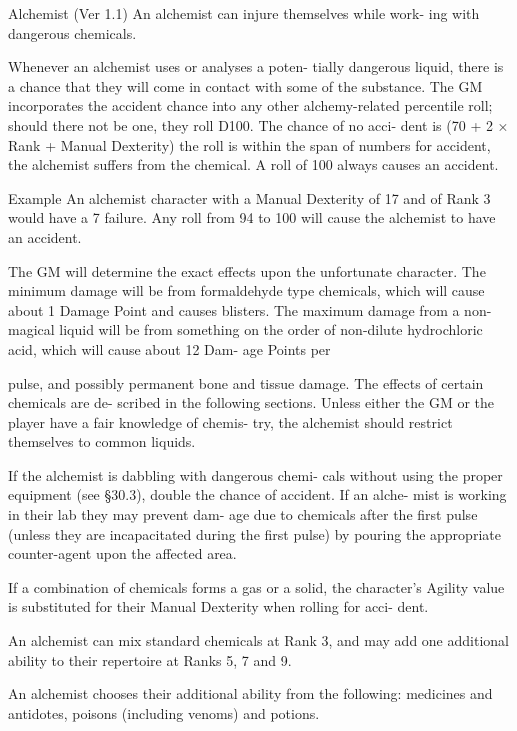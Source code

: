 \begin{Chapter}{Alchemist (Ver 1.1)}
An alchemist can injure themselves while work-
ing with dangerous chemicals. 

Whenever  an  alchemist  uses  or  analyses  a  poten-
tially  dangerous  liquid,  there  is  a  chance  that  they 
will  come  in  contact  with  some  of  the  substance. 
The GM incorporates the accident chance into any 
other  alchemy-related  percentile  roll;  should  there 
not be one, they roll D100. The chance of no acci-
dent  is  (70  +  2  ×  Rank  +  Manual  Dexterity)%
the roll is within the span of numbers for accident, 
the  alchemist  suffers  from  the  chemical.  A  roll  of 
100 always causes an accident. 

Example 
An  alchemist  character  with  a  Manual 
Dexterity of 17 and of Rank 3 would have a 7%
failure. Any roll from 94 to 100 will cause the alchemist to 
have an accident. 

The  GM  will  determine  the  exact  effects  upon the 
unfortunate  character.  The  minimum  damage  will 
be  from  formaldehyde  type  chemicals,  which  will 
cause  about  1  Damage  Point  and  causes  blisters. 
The  maximum  damage  from  a  non-magical  liquid 
will  be  from something  on  the  order  of  non-dilute 
hydrochloric acid, which will cause about 12 Dam-
age Points per 

pulse,  and  possibly  permanent  bone  and  tissue 
damage.  The  effects  of  certain  chemicals  are  de-
scribed in the following sections. Unless either the 
GM or the player have a fair knowledge of chemis-
try,  the  alchemist  should  restrict  themselves  to 
common liquids. 

If the alchemist is dabbling with dangerous chemi-
cals  without  using  the  proper  equipment  (see 
§30.3), double the chance of accident. If an alche-
mist is working in their lab they may prevent dam-
age  due  to  chemicals  after  the  first  pulse  (unless 
they  are  incapacitated  during  the  first  pulse)  by 
pouring  the  appropriate  counter-agent  upon  the 
affected area. 

If  a  combination  of  chemicals  forms  a  gas  or  a 
solid,  the  character’s  Agility  value  is  substituted 
for  their  Manual  Dexterity  when  rolling  for  acci-
dent. 

An  alchemist  can  mix  standard  chemicals  at 
Rank  3,  and  may  add  one  additional  ability  to 
their repertoire at Ranks 5, 7 and 9. 

An  alchemist  chooses  their  additional  ability  from 
the  following:  medicines  and  antidotes,  poisons 
(including venoms) and potions. 


\end{Chapter}
